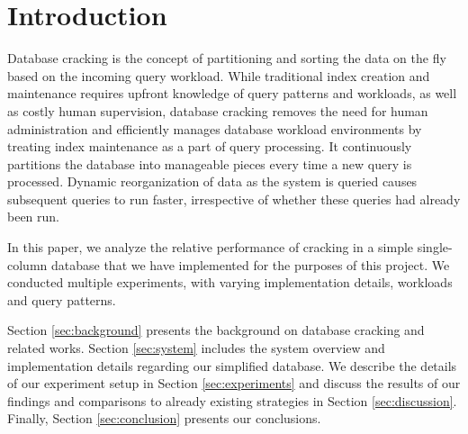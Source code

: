 \section{Introduction}

Database cracking is the concept of partitioning and sorting the data on the fly based on the incoming query workload. While traditional index creation and maintenance requires upfront knowledge of query patterns and workloads, as well as costly human supervision, database cracking removes the need for human administration and efficiently manages database workload environments by treating index maintenance as a part of query processing. It continuously partitions the database into manageable pieces every time a new query is processed. Dynamic reorganization of data as the system is queried causes subsequent queries to run faster, irrespective of whether these queries had already been run.

In this paper, we analyze the relative performance of cracking in a simple single-column database that we have implemented for the purposes of this project. We conducted multiple experiments, with varying implementation details, workloads and query patterns. 

Section \ref{sec:background} presents the background on database cracking and related works. Section \ref{sec:system} includes the system overview and implementation details regarding our simplified database. We describe the details of our experiment setup in Section \ref{sec:experiments} and discuss the results of our findings and comparisons to already existing strategies in Section \ref{sec:discussion}. Finally, Section \ref{sec:conclusion} presents our conclusions.

\label{sec:introduction}
